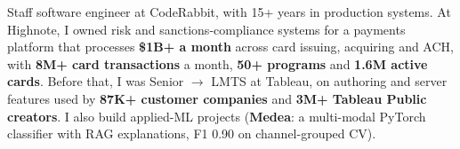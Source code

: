 \documentclass[11pt, letterpaper]{awesome-cv}
\begin{document}
\makecvheader[C]

\begin{cvparagraph}
Staff software engineer at CodeRabbit, with 15+ years in production systems. At Highnote, I owned risk and sanctions-compliance systems for a payments platform that processes \textbf{\$1B+ a month} across card issuing, acquiring and ACH, with \textbf{8M+ card transactions} a month, \textbf{50+ programs} and \textbf{1.6M active cards}. Before that, I was Senior $\rightarrow$ LMTS at Tableau, on authoring and server features used by \textbf{87K+ customer companies} and \textbf{3M+ Tableau Public creators}. I also build applied-ML projects (\textbf{Medea}: a multi-modal PyTorch classifier with RAG explanations, F1 0.90 on channel-grouped CV).
\end{cvparagraph}
\end{document}
